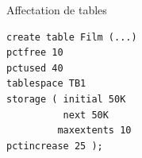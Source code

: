 \documentclass{beamer}
\begin{document}
\begin{frame}[fragile]{Affectation de tables}

\begin{verbatim}
create table Film (...)
pctfree 10
pctused 40
tablespace TB1
storage ( initial 50K
          next 50K
         maxextents 10
pctincrease 25 );
\end{verbatim}

\end{frame}
\end{document}
